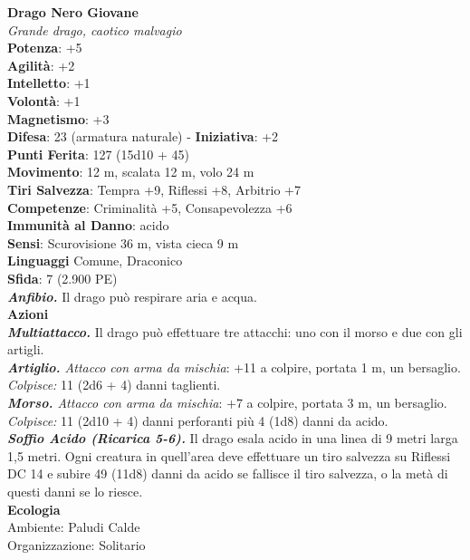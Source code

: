 \begin{multicols}{2}
\medskip\textbf{Drago Nero Giovane}\\
\emph{Grande drago, caotico malvagio}\\
\textbf{Potenza}: +5\\
\textbf{Agilità}: +2\\
\textbf{Intelletto}: +1\\
\textbf{Volontà}: +1\\
\textbf{Magnetismo}: +3\\
\textbf{Difesa}: 23 (armatura naturale) - \textbf{Iniziativa}: +2\\
\textbf{Punti Ferita}: 127 (15d10 + 45)\\
\textbf{Movimento}: 12 m, scalata 12 m, volo 24 m\\
\textbf{Tiri Salvezza}: Tempra +9, Riflessi +8, Arbitrio +7\\
\textbf{Competenze}: Criminalità +5, Consapevolezza +6\\
\textbf{Immunità al Danno}: acido\\
\textbf{Sensi}: Scurovisione 36 m, vista cieca 9 m\\
\textbf{Linguaggi} Comune, Draconico\\
\textbf{Sfida}: 7 (2.900 PE)\smallskip\\
\emph{\textbf{Anfibio.}} Il drago può respirare aria e acqua.\\
\smallskip\textbf{Azioni}\\
\emph{\textbf{Multiattacco.}} Il drago può effettuare tre attacchi: uno con il morso e due con gli artigli.\\
\emph{\textbf{Artiglio.} Attacco con arma da mischia}: +11 a colpire, portata 1 m, un bersaglio.\\
\emph{Colpisce:} 11 (2d6 + 4) danni taglienti.\\
\emph{\textbf{Morso.} Attacco con arma da mischia}: +7 a colpire, portata 3 m, un bersaglio.\\
\emph{Colpisce:} 11 (2d10 + 4) danni perforanti più 4 (1d8) danni da acido.\\
\emph{\textbf{Soffio Acido (Ricarica 5-6).}} Il drago esala acido in una linea di 9 metri larga 1,5 metri. Ogni creatura in quell'area deve effettuare un tiro salvezza su Riflessi DC 14 e subire 49 (11d8) danni da acido se fallisce il tiro salvezza, o la metà di questi danni se lo riesce.\\
\textbf{Ecologia}\\
Ambiente: Paludi Calde\\
Organizzazione: Solitario\\

\end{multicols}
